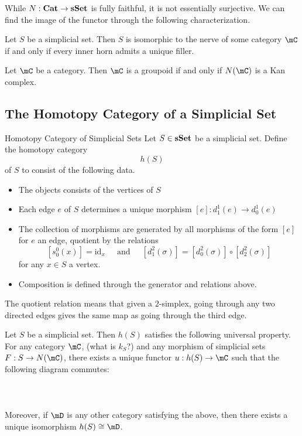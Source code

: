 \documentclass[a4paper]{article}
\begin{document}
While $N:\bold{Cat}\to\bold{sSet}$ is fully faithful, it is not essentially surjective. We can find the image of the functor through the following characterization. 

\begin{prp}{}{} Let $S$ be a simplicial set. Then $S$ is isomorphic to the nerve of some category $\mC$ if and only if every inner horn admits a unique filler. 
\end{prp}

\begin{lmm}{}{} Let $\mC$ be a category. Then $\mC$ is a groupoid if and only if $N(\mC)$ is a Kan complex. 
\end{lmm}

\subsection{The Homotopy Category of a Simplicial Set}
\begin{defn}{Homotopy Category of Simplicial Sets}{} Let $S\in\bold{sSet}$ be a simplicial set. Define the homotopy category $$h(S)$$ of $S$ to consist of the following data. 
\begin{itemize}
\item The objects consists of the vertices of $S$
\item Each edge $e$ of $S$ determines a unique morphism $[e]:d_1^1(e)\to d_0^1(e)$
\item The collection of morphisms are generated by all morphisms of the form $[e]$ for $e$ an edge, quotient by the relations $$[s_0^0(x)]=\text{id}_x\;\;\;\;\text{ and }\;\;\;\;[d_1^2(\sigma)]=[d_0^2(\sigma)]\circ[d_2^2(\sigma)]$$ for any $x\in S$ a vertex. 
\item Composition is defined through the generator and relations above. 
\end{itemize}
\end{defn}

The quotient relation means that given a $2$-simplex, going through any two directed edges gives the same map as going through the third edge. 

\begin{prp}{}{} Let $S$ be a simplicial set. Then $h(S)$ satisfies the following universal property. For any category $\mC$, (what is $k_S$?) and any morphism of simplicial sets $F:S\to N(\mC)$, there exists a unique functor $u:h(S)\to\mC$ such that the following diagram commutes: \\~\\
\\~\\
Moreover, if $\mD$ is any other category satisfying the above, then there exists a unique isomorphism $h(S)\cong\mD$. 
\end{prp}
\end{document}
